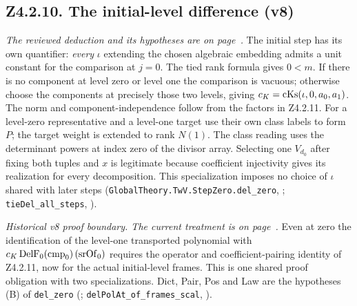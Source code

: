 \subsection{Z4.2.10. The initial-level difference (v8)}\label{r6:Z4.2.10}
\emph{The reviewed deduction and its hypotheses are on page~\pageref{r8:Z4.2.10}.}
The initial step has its own quantifier: \emph{every} \(\iota\) extending the chosen algebraic embedding admits a unit constant for the comparison at \(j=0\). The tied rank formula gives \(0<m\). If there is no component at level zero or level one the comparison is vacuous; otherwise choose the components at precisely those two levels, giving \(c_K={\rm cKs}(\iota,0,a_0,a_1)\). The norm and component-independence follow from the factors in Z4.2.11. For a level-zero representative and a level-one target use their own class labels to form \(P\); the target weight is extended to rank \(N(1)\). The class reading uses the determinant powers at index zero of the divisor array. Selecting one \(V_{d_0}\) after fixing both tuples and \(x\) is legitimate because coefficient injectivity gives its realization for every decomposition. This specialization imposes no choice of \(\iota\) shared with later steps (\nolinkurl{GlobalTheory.TwV.StepZero.del_zero}, ; \nolinkurl{tieDel_all_steps}, ).

\emph{Historical v8 proof boundary. The current treatment is on page~\pageref{r8:Z4.2.10}.} Even at zero the identification of the level-one transported polynomial with \(c_K\,{\rm DelF}_0({\rm cmp}_0)\,({\rm srOf}_0)\) requires the operator and coefficient-pairing identity of Z4.2.11, now for the actual initial-level frames. This is one shared proof obligation with two specializations. Dict, Pair, Pos and Law are the hypotheses (B) of \nolinkurl{del_zero} (; \nolinkurl{delPolAt_of_frames_scal}, ).

